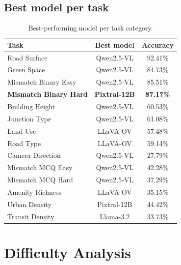\documentclass[11pt,a4paper]{article}
\begin{document}
\subsection{Best model per task}

\begin{table}[H]
\centering
\small
\begin{tabular}{lcc}
\toprule
\textbf{Task} & \textbf{Best model} & \textbf{Accuracy} \\
\midrule
Road Surface          & Qwen2.5-VL  & 92.41\% \\
Green Space           & Qwen2.5-VL  & 84.73\% \\
Mismatch Binary Easy  & Qwen2.5-VL  & 85.51\% \\
\textbf{Mismatch Binary Hard}  & \textbf{Pixtral-12B} & \textbf{87.17\%} \\
Building Height       & Qwen2.5-VL  & 60.53\% \\
Junction Type         & Qwen2.5-VL  & 61.08\% \\
Land Use              & LLaVA-OV    & 57.48\% \\
Road Type             & LLaVA-OV    & 59.14\% \\
Camera Direction      & Qwen2.5-VL  & 27.79\% \\
Mismatch MCQ Easy     & Qwen2.5-VL  & 42.28\% \\
Mismatch MCQ Hard     & Qwen2.5-VL  & 37.29\% \\
Amenity Richness      & LLaVA-OV    & 35.15\% \\
Urban Density         & Pixtral-12B & 44.42\% \\
Transit Density       & Llama-3.2   & 33.73\% \\
\bottomrule
\end{tabular}
\caption{Best-performing model per task category.}
\label{tab:best_per_task}
\end{table}

\section{Difficulty Analysis}

\end{document}
